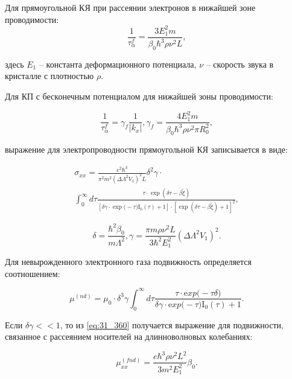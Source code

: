 Для прямоугольной КЯ при рассеянии электронов в нижайшей зоне проводимости:
\begin{equation} \label{eq:31_330}
\frac{1}{\tau _{\alpha }^{f} } =\frac{3E_{1}^{2} m}{\beta _{0} \hbar ^{3} \rho \nu ^{2} L},
\end{equation}

\noindent здесь $E_{1} $ -- константа деформационного потенциала, $\nu $ -- скорость звука в кристалле с плотностью $\rho $.

Для КП с бесконечным потенциалом для нижайшей зоны проводимости:

\begin{equation} \label{eq:31_340}
\frac{1}{\tau _{\alpha }^{f} } =\gamma _{f} \frac{1}{\left|k_{x} \right|} , \gamma _{f} =\frac{4E_{1}^{2} m}{\beta _{0} \hbar ^{3} \rho \nu ^{2} \pi R_{0}^{2} },
\end{equation}
 
\noindent выражение для электропроводности прямоугольной КЯ записывается в виде:

\begin{multline} \label{eq:31_350}
\sigma _{xx} =\frac{e^{2} \hbar ^{3} }{\pi ^{2} m^{2} \left(\Delta \Lambda ^{2} V_{1} \right)^{2} L} \delta ^{2} \gamma \cdot \\
 \int _{0}^{\infty }d\tau \frac{\tau \cdot {\exp}\left(\delta \tau -\beta \tilde{\xi }\right)}{\left[\delta \gamma \cdot {\exp(}-\tau ){\mathrm I}_{{\mathrm 0}} (\tau )+1\right]\cdot \left[{\exp}\left(\delta \tau -\beta \tilde{\xi }\right)+1\right]^{2} },
\end{multline}
  
\[
\delta =\frac{\hbar ^{2} \beta _{0} }{m\Lambda ^{2} } , \gamma =\frac{\pi m\rho \nu ^{2} L}{3\hbar ^{2} E_{1}^{2} } \left(\Delta \Lambda ^{2} V_{1} \right)^{2} .
\]
 
Для невырожденного электронного газа подвижность определяется соотношением:

\begin{equation} \label{eq:31_360}
\mu ^{(nd)} =\mu _{0} \cdot \delta ^{3} \gamma \int _{0}^{\infty }d\tau \frac{\tau \cdot {\mathrm exp(}-\tau \delta )}{\delta \gamma \cdot {\mathrm exp(}-\tau ){\mathrm I}_{{\mathrm 0}} (\tau )+1}. 
\end{equation}

Если $\delta \gamma <<1$, то из \eqref{eq:31_360} получается выражение для подвижности, связанное с рассеянием носителей на длинноволновых колебаниях:

\begin{equation} \label{eq:31_370}
\mu _{xx}^{(fnd)} =\frac{e\hbar ^{3} \rho \nu ^{2} L^{2} }{3m^{2} E_{1}^{2} } \beta _{0}. 
\end{equation}

